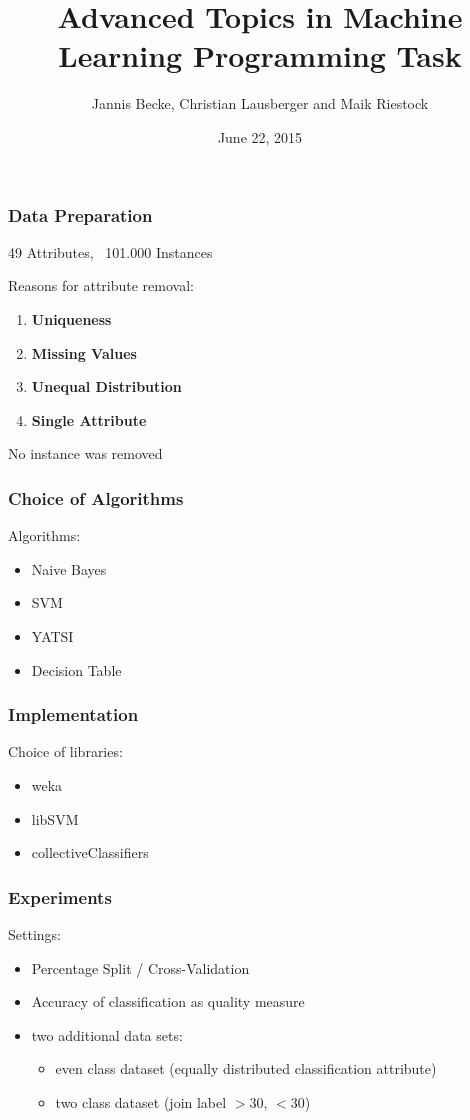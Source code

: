 \documentclass{beamer}
\title{Advanced Topics in Machine Learning Programming Task}
\author{Jannis Becke, Christian Lausberger and Maik Riestock}
\date{June 22, 2015}
\institute{Advanced Topics in Machine Learning}
\begin{document}
\begin{frame}[plain]
 \titlepage
\end{frame}

\begin{frame}
\frametitle{Data Preparation}

49 Attributes, ~101.000 Instances

Reasons for attribute removal:
\begin{enumerate}
\item \textbf{Uniqueness}

\item \textbf{Missing Values}

\item \textbf{Unequal Distribution}

\item \textbf{Single Attribute}
\end{enumerate}
No instance was removed
\end{frame}


\begin{frame}
\frametitle{Choice of Algorithms}
Algorithms:
\begin{itemize}
 \item Naive Bayes
 \item SVM
 \item YATSI
 \item Decision Table
\end{itemize}
\end{frame}

\begin{frame}
\frametitle{Implementation}
Choice of libraries:
\begin{itemize}
 \item weka
 \item libSVM
 \item collectiveClassifiers
\end{itemize}
\end{frame}

\begin{frame}
\frametitle{Experiments}
Settings:
\begin{itemize}
 \item Percentage Split / Cross-Validation
 \item Accuracy of classification as quality measure
 \item two additional data sets:
 \begin{itemize}
 	\item even class dataset (equally distributed classification attribute)
 	\item two class dataset (join label $>30$, $<30$)
 \end{itemize}
\end{itemize}
\end{frame}
\end{document}
